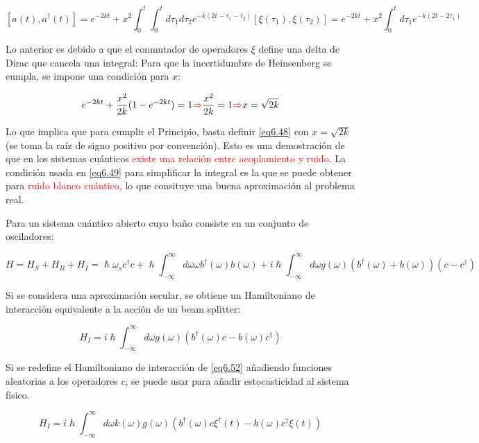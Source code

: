 \documentclass{book}
\begin{document}
\begin{equation}\label{eq6.49}[a(t),a^\dag(t)]=e^{-2kt}+x^2\int_0^t\int_0^t d\tau_1 d\tau_2 e^{-k(2t-\tau_1-\tau_2)} [\xi(\tau_1),\xi(\tau_2)]=e^{-2kt}+x^2\int_0^t d\tau_1  e^{-k(2t-2\tau_1)}  \end{equation}

Lo anterior es debido a que el conmutador de operadores $\xi$ define una delta de Dirac que cancela una integral: Para que la incertidumbre de Heinsenberg se cumpla, se impone una condición para $x$:

\begin{equation}\label{eq6.50}e^{-2kt}+\frac{x^2}{2k}(1-e^{-2kt})=1\textcolor{red}{\Rightarrow} \frac{x^2}{2k}=1 \textcolor{red}{\Rightarrow} x=\sqrt{2k}\end{equation}

Lo que implica que para cumplir el Principio, basta definir \ref{eq6.48} con $x=\sqrt{2k}$ (se toma la raíz de signo positivo por convención). Esto es una demostración de que en los sistemas cuánticos \textcolor{red}{existe una relación entre acoplamiento y ruido}. La condición usada en \ref{eq6.49} para simplificar la integral es la que se puede obtener para \textcolor{red}{ruido blanco cuántico}, lo que consituye una buena aproximación al problema real.

Para un sistema cuántico abierto cuyo baño consiste en un conjunto de osciladores:

\begin{equation}\label{eq6.51}H=H_S+H_B+H_I=\hslash\omega_s c^\dag c+\hslash\int_{-\infty}^\infty d\omega \omega b^\dag(\omega)b(\omega)+i\hslash\int_{-\infty}^\infty d\omega g(\omega)(b^\dag(\omega)+b(\omega))(c-c^\dag)\end{equation}

Si se considera una aproximación secular, se obtiene un Hamiltoniano de interacción equivalente a la acción de un beam splitter:

\begin{equation}\label{eq6.52}H_I=i\hslash\int_{-\infty}^\infty d\omega g(\omega)(b^\dag(\omega) c-b(\omega)c^\dag)\end{equation}

Si se redefine el Hamiltoniano de interacción de \ref{eq6.52} añadiendo funciones aleatorias a los operadores $c$, se puede usar para añadir estocasticidad al sistema físico. 

\begin{equation}\label{eq6.53}H_I=i\hslash\int_{-\infty}^\infty d\omega k(\omega)
g(\omega)(b^\dag(\omega) c\xi^\dag(t)-b(\omega)c^\dag\xi(t))\end{equation}
\end{document}
